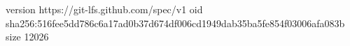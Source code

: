 version https://git-lfs.github.com/spec/v1
oid sha256:516fee5dd786c6a17ad0b37d674df006cd1949dab35ba5fe854f03006afa083b
size 12026
